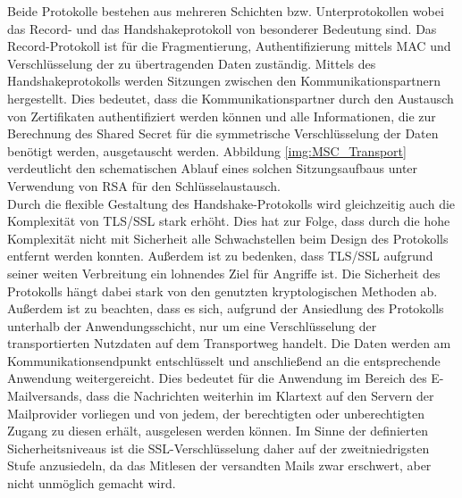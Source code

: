 \documentclass  [paper=a4,
				fontsize=12pt,
				listof=totoc,
				bibliography=totoc
				]{scrreprt}
\begin{document}
			
			Beide Protokolle bestehen aus mehreren Schichten bzw. Unterprotokollen wobei das Record- und das Handshakeprotokoll von besonderer Bedeutung sind. 
			Das Record-Protokoll ist für die Fragmentierung, Authentifizierung mittels \ac{MAC} und Verschlüsselung der zu übertragenden Daten zuständig. 
			Mittels des Handshakeprotokolls werden Sitzungen zwischen den Kommunikationspartnern hergestellt. 
			Dies bedeutet, dass die Kommunikationspartner durch den Austausch von Zertifikaten authentifiziert werden können und alle Informationen, die zur Berechnung des Shared Secret für die symmetrische Verschlüsselung der Daten benötigt werden, ausgetauscht werden. 
			Abbildung \ref{img:MSC_Transport} verdeutlicht den schematischen Ablauf eines solchen Sitzungsaufbaus unter Verwendung von \ac{RSA} für den Schlüsselaustausch.\\
			
			Durch die flexible Gestaltung des Handshake-Protokolls wird gleichzeitig auch die Komplexität von \ac{TLS/SSL} stark erhöht. 
			Dies hat zur Folge, dass durch die hohe Komplexität nicht mit Sicherheit alle Schwachstellen beim Design des Protokolls entfernt werden konnten. 
			Außerdem ist zu bedenken, dass \ac{TLS/SSL} aufgrund seiner weiten Verbreitung ein lohnendes Ziel für Angriffe ist. Die Sicherheit des Protokolls hängt dabei stark von den genutzten kryptologischen Methoden ab. 
			Außerdem ist zu beachten, dass es sich, aufgrund der Ansiedlung des Protokolls unterhalb der Anwendungsschicht, nur um eine Verschlüsselung der transportierten Nutzdaten auf dem Transportweg handelt. 
			Die Daten werden am Kommunikationsendpunkt entschlüsselt und anschließend an die entsprechende Anwendung weitergereicht.
			Dies bedeutet für die Anwendung im Bereich des E-Mailversands, dass die Nachrichten weiterhin im Klartext auf den Servern der Mailprovider vorliegen und von jedem, der berechtigten oder unberechtigten Zugang zu diesen erhält, ausgelesen werden können.
			Im Sinne der definierten Sicherheitsniveaus ist die \ac{SSL}-Verschlüsselung daher auf der zweitniedrigsten Stufe anzusiedeln, da das Mitlesen der versandten Mails zwar erschwert, aber nicht unmöglich gemacht wird.\\
			
\end{document}
